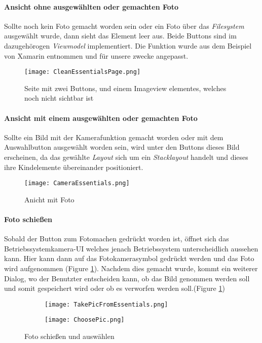 \paragraph{Ansicht ohne ausgewählten oder gemachten Foto}
 Sollte noch kein Foto gemacht worden sein oder ein Foto über das \textit{Filesystem}
 ausgewählt wurde, dann sieht das Element leer aus. Beide Buttons sind im dazugehörogen \textit{Viewmodel} implementiert.
 Die Funktion wurde aus dem Beispiel von Xamarin entnommen und für unsere zwecke angepasst.
\begin{figure}[h]
    \centering
    \texttt{[image: CleanEssentialsPage.png]}
    \caption{Seite mit zwei Buttons, und einem Imageview elementes, welches noch nicht sichtbar ist}
\end{figure}
\newpage
\paragraph{Ansicht mit einem ausgewählten oder gemachten Foto}
 Sollte ein Bild mit der Kamerafunktion gemacht worden oder mit dem Auswahlbutton ausgewählt worden sein,
 wird unter den Buttons dieses Bild erscheinen, da das gewählte \textit{Layout} sich um ein \textit{Stacklayout}
 handelt und dieses ihre Kindelemente übereinander positioniert.
\begin{figure}[h!]
    \centering
    \texttt{[image: CameraEssentials.png]}
    \caption{Anicht mit Foto}
\end{figure}

\paragraph{Foto schießen}
 Sobald der Button zum Fotomachen gedrückt worden ist, öffnet sich das Betriebssystemkamera-UI
 welches jenach Betriebssystem unterscheidlich aussehen kann. Hier kann dann auf das Fotokamerasymbol
 gedrückt werden und das Foto wird aufgenommen (Figure \ref{fig:TakeFoto}). 
 Nachdem dies gemacht wurde, kommt ein weiterer Dialog, wo der Benutzter entscheiden kann, ob das
 Bild genommen werden soll und somit gespeichert wird oder ob es verworfen werden soll.(Figure \ref{fig:TakeFoto})

 
\begin{figure}[h!]
    \centering
    \begin{subfigure}[b]{0.4\linewidth}
        \texttt{[image: TakePicFromEssentials.png]}
      \end{subfigure}
      \begin{subfigure}[b]{0.4\linewidth}
        \texttt{[image: ChoosePic.png]}
      \end{subfigure}
    \caption{Foto schießen und auswählen}
    \label{fig:TakeFoto}
\end{figure}

